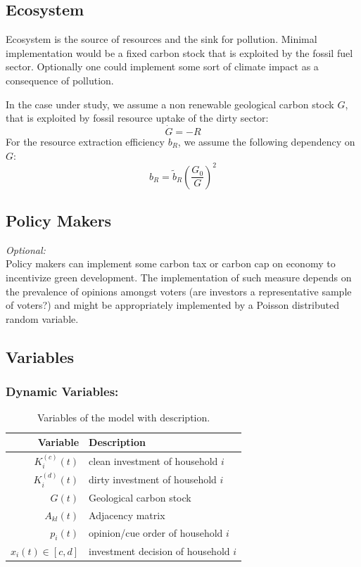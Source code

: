 \subsection{Ecosystem}
Ecosystem is the source of resources and the sink for pollution. Minimal implementation would be a fixed carbon stock that is exploited by the fossil fuel sector. Optionally one could implement some sort of climate impact as a consequence of pollution.

In the case under study, we assume a non renewable geological carbon stock $G$, that is exploited by fossil resource uptake of the dirty sector:
\begin{equation}
	\dot{G} = -R
	\label{resource_dynamics}
\end{equation}
For the resource extraction efficiency $b_R$, we assume the following dependency on $G$:
\begin{equation}
	b_R = \tilde{b}_R \left( \frac{G_0}{G} \right)^{2}
	\label{extraction_efficiency}
\end{equation}

\subsection{Policy Makers}
\textit{Optional:} \\
Policy makers can implement some carbon tax or carbon cap on economy to incentivize green development. The implementation of such measure depends on the prevalence of opinions amongst voters (are investors a representative sample of voters?) and might be appropriately implemented by a Poisson distributed random variable.

\subsection{Variables}

\subsubsection{Dynamic Variables:}

\begin{table}[H]
	\centering
	\begin{tabular}{r|l}
		Variable & Description \\\hline
		$K^{(c)}_i(t)$ & clean investment of household $i$ \\
		$K^{(d)}_i(t)$ & dirty investment of household $i$ \\
		$G(t)$ & Geological carbon stock \\
		$A_{kl}(t)$ & Adjacency matrix \\
		$p_i(t)$ & opinion/cue order of household $i$ \\
		$x_i(t) \in [c,d]$ & investment decision of household $i$ 
	\end{tabular}
	\caption{Variables of the model with description.}
	\label{tab:independent_variables}
\end{table}
 
